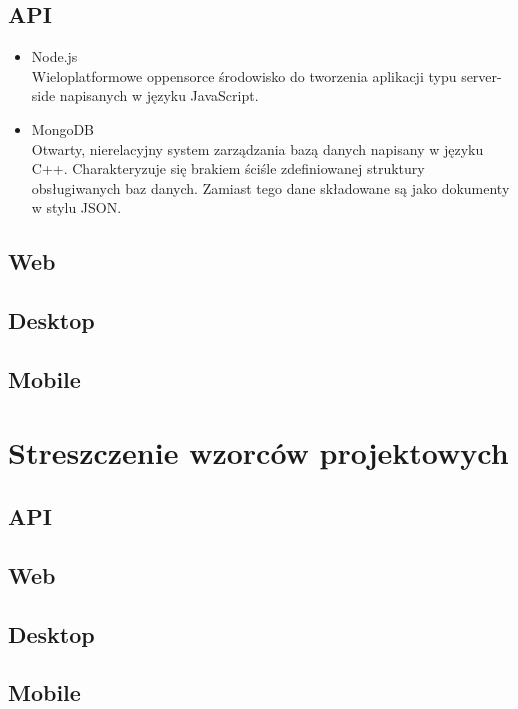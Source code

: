\documentclass{article}
\begin{document}
    \subsection{API}
    \begin{itemize}
            \item Node.js\\
            Wieloplatformowe oppensorce środowisko do tworzenia aplikacji typu server-side napisanych w języku JavaScript.
            \item MongoDB\\
             Otwarty, nierelacyjny system zarządzania bazą danych napisany w języku C++. Charakteryzuje się brakiem ściśle zdefiniowanej struktury obsługiwanych baz danych. Zamiast tego dane składowane są jako dokumenty w stylu JSON.
             \end{itemize}
    \subsection{Web}
        
        
    \subsection{Desktop}
    
    \subsection{Mobile}

\section{Streszczenie wzorców projektowych}
    \subsection{API}
       
        
    \subsection{Web}
        
        
    \subsection{Desktop}
    
    \subsection{Mobile}
\end{document}
